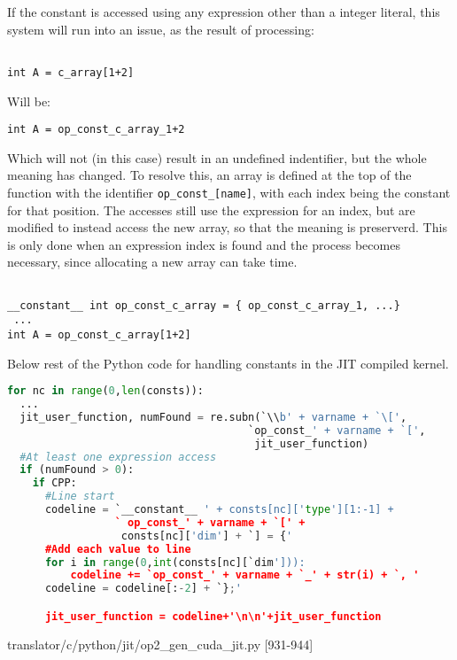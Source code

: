 If the constant is accessed using any expression other than a integer literal, this system will run into an issue, as the result of processing:
\begin{lstlisting}[frame=none,backgroundcolor=\color{white}]

int A = c_array[1+2]
\end{lstlisting}
Will be:
\begin{lstlisting}[frame=none,backgroundcolor=\color{white}]
int A = op_const_c_array_1+2
\end{lstlisting}
\noindent Which will not (in this case) result in an undefined indentifier, but the whole meaning has changed.
To resolve this, an array is defined at the top of the function with the identifier \verb|op_const_[name]|, with each index being the constant for that position. The accesses still use the expression for an index, but are modified to instead access the new array, so that the meaning is preserverd. This is only done when an expression index is found and the process becomes necessary, since allocating a new array can take time.
\begin{lstlisting}[frame=none,backgroundcolor=\color{white}]

__constant__ int op_const_c_array = { op_const_c_array_1, ...}
 ...
int A = op_const_c_array[1+2]
\end{lstlisting}
Below rest of the Python code for handling constants in the JIT compiled kernel.
\begin{lstlisting}[backgroundcolor = \color{lightgray!20}, language=Python]
for nc in range(0,len(consts)):
  ...
  jit_user_function, numFound = re.subn(`\\b' + varname + `\[',
                                      `op_const_' + varname + `[',
                                       jit_user_function)
  #At least one expression access
  if (numFound > 0):
    if CPP:
      #Line start
      codeline = `__constant__ ' + consts[nc]['type'][1:-1] +
                 ` op_const_' + varname + `[' +
                  consts[nc]['dim'] + `] = {'
      #Add each value to line
      for i in range(0,int(consts[nc][`dim'])):
          codeline += `op_const_' + varname + `_' + str(i) + `, '
      codeline = codeline[:-2] + `};'

      jit_user_function = codeline+'\n\n'+jit_user_function
\end{lstlisting}
\vspace{-1em}
\hspace*{\fill}\footnotesize{translator/c/python/jit/op2\_gen\_cuda\_jit.py [931-944]}

